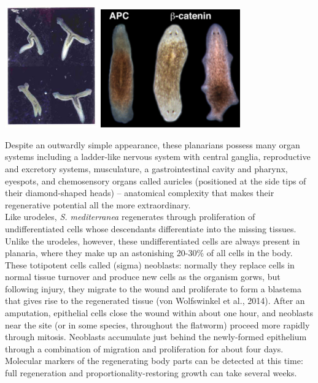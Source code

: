 \documentclass{article}
\begin{document}
\begin{center}
\includegraphics[width=0.3\textwidth]{planaria_twoheads.jpg} \hfill \includegraphics[width=0.45\textwidth]{heads.pdf}
\end{center}

Despite an outwardly simple appearance, these planarians possess many organ systems including a ladder-like nervous system with central ganglia, reproductive and excretory systems, musculature, a gastrointestinal cavity and pharynx, eyespots, and chemosensory organs called auricles (positioned at the side tips of their diamond-shaped heads) -- anatomical complexity that makes their regenerative potential all the more extraordinary.\\

Like urodeles, \textit{S. mediterranea} regenerates through proliferation of undifferentiated cells whose descendants differentiate into the missing tissues. Unlike the urodeles, however, these undifferentiated cells are always present in planaria, where they make up an astonishing 20-30\% of all cells in the body. These totipotent cells called (sigma) neoblasts: normally they replace cells in normal tissue turnover and produce new cells as the organism gorws, but following injury, they migrate to the wound and proliferate to form a blastema that gives rise to the regenerated tissue (von Wolfswinkel et al., 2014). After an amputation, epithelial cells close the wound within about one hour, and neoblasts near the site (or in some species, throughout the flatworm) proceed more rapidly through mitosis. Neoblasts accumulate just behind the newly-formed epithelium through a combination of migration and proliferation for about four days. Molecular markers of the regenerating body parts can be detected at this time: full regeneration and proportionality-restoring growth can take several weeks.
\end{document}
